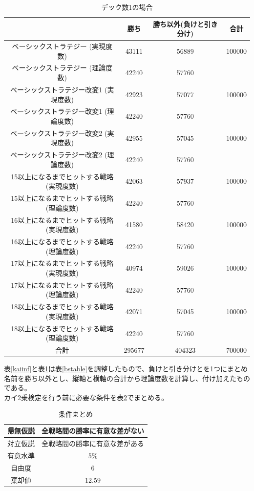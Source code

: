 \begin{table}[H]
 \caption{デック数1の場合\label{kai1}}
 \begin{center}
  \begin{tabular}{|c|c|c|c|}
    \hline  & 勝ち & 勝ち以外(負けと引き分け) & 合計 \\
    \hline ベーシックストラテジー (実現度数)& 43111 & 56889 & 100000 \\
             ベーシックストラテジー (理論度数)& 42240 & 57760 &  \\
    \hline ベーシックストラテジー改変1 (実現度数)& 42923 & 57077 & 100000 \\
             ベーシックストラテジー改変1 (理論度数)& 42240 & 57760 &  \\
    \hline ベーシックストラテジー改変2 (実現度数)& 42955 & 57045 & 100000 \\
              ベーシックストラテジー改変2 (理論度数)& 42240 & 57760 &  \\
    \hline 15以上になるまでヒットする戦略 (実現度数)& 42063 & 57937 & 100000 \\
             15以上になるまでヒットする戦略 (理論度数)& 42240 & 57760 & 　\\
    \hline 16以上になるまでヒットする戦略 (実現度数)& 41580 & 58420 & 100000 \\
             16以上になるまでヒットする戦略 (理論度数)& 42240 & 57760 & 　\\
    \hline 17以上になるまでヒットする戦略 (実現度数)& 40974 & 59026 & 100000 \\
             17以上になるまでヒットする戦略 (理論度数)& 42240 & 57760 & 　\\
    \hline 18以上になるまでヒットする戦略 (実現度数)& 42071 & 57045 & 100000 \\
             18以上になるまでヒットする戦略 (理論度数)& 42240 & 57760 & 　\\
    \hline  合計 & 295677 & 404323 & 700000 \\
    \hline
  \end{tabular}
 \end{center}
\end{table}
表\ref{kaiinf}と表\ref{kai1}は表\ref{bstable}を調整したもので、負けと引き分けとを1つにまとめ名前を勝ち以外とし、縦軸と横軸の合計から理論度数を計算し、付け加えたものである。\\
カイ2乗検定を行う前に必要な条件を表\ref{hypothesis1}でまとめる。
\begin{table}[H]
 \caption{条件まとめ\label{hypothesis1}}
 \begin{center}
  \begin{tabular}{|c|c|}
  \hline 帰無仮説 & 全戦略間の勝率に有意な差がない \\
  \hline 対立仮説 & 全戦略間の勝率に有意な差がある \\
  \hline 有意水準 & 5\% \\
  \hline 自由度 & 6 \\
  \hline 棄却値 & 12.59 \\
  \hline 
  \end{tabular}
 \end{center}
\end{table}
